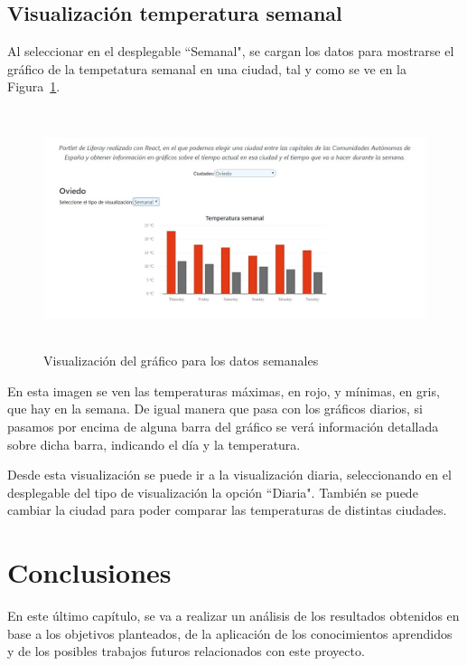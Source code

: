 \documentclass[a4paper, 12pt]{book}
\begin{document}
\section{Visualización temperatura semanal}
\label{sec:visualizacion-semanal}
Al seleccionar en el desplegable ``Semanal", se cargan los datos para mostrarse el gráfico de la tempetatura semanal en una ciudad, tal y como se ve en la Figura~\ref{fig:pantalla_semanal}.
\begin{figure}[h]
  \centering
  \includegraphics[width=13cm, height=7cm]{img_usadas/pantalla_semanal.png}
  \caption{Visualización del gráfico para los datos semanales}
  \label{fig:pantalla_semanal}
\end{figure}

En esta imagen se ven las temperaturas máximas, en rojo, y mínimas, en gris, que hay en la semana. De igual manera que pasa con los gráficos diarios, si pasamos por encima de alguna barra del gráfico se verá información detallada sobre dicha barra, indicando el día y la temperatura.

\vspace{5mm}
Desde esta visualización se puede ir a la visualización diaria, seleccionando en el desplegable del tipo de visualización la opción ``Diaria". También se puede cambiar la ciudad para poder comparar las temperaturas de distintas ciudades.





\cleardoublepage
\chapter{Conclusiones}
\label{chap:conclusiones}
En este último capítulo, se va a realizar un análisis de los resultados obtenidos en base a los objetivos planteados, de la aplicación de los conocimientos aprendidos y de los posibles trabajos futuros relacionados con este proyecto.
\end{document}
